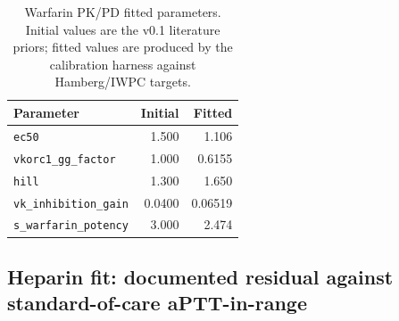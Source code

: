 \documentclass[11pt]{article}
\begin{document}
\begin{table}[ht]
\centering
\caption{Warfarin PK/PD fitted parameters. Initial values are the v0.1 literature priors; fitted values are produced by the calibration harness against Hamberg/IWPC targets.}
\label{tab:warfarin_fit}
\begin{tabular}{@{}lrr@{}}
\toprule
\textbf{Parameter} & \textbf{Initial} & \textbf{Fitted} \\
\midrule
\texttt{ec50} & 1.500 & 1.106 \\
\texttt{vkorc1\_gg\_factor} & 1.000 & 0.6155 \\
\texttt{hill} & 1.300 & 1.650 \\
\texttt{vk\_inhibition\_gain} & 0.0400 & 0.06519 \\
\texttt{s\_warfarin\_potency} & 3.000 & 2.474 \\
\bottomrule
\end{tabular}
\end{table}

\begin{table}[ht]
\centering
\caption{Warfarin calibration residuals on held-out calibration benchmarks. All three targets fall within 0.004~INR of expected.}
\label{tab:warfarin_residuals}
\end{table}

\subsection{Heparin fit: documented residual against standard-of-care aPTT-in-range}
\end{document}
